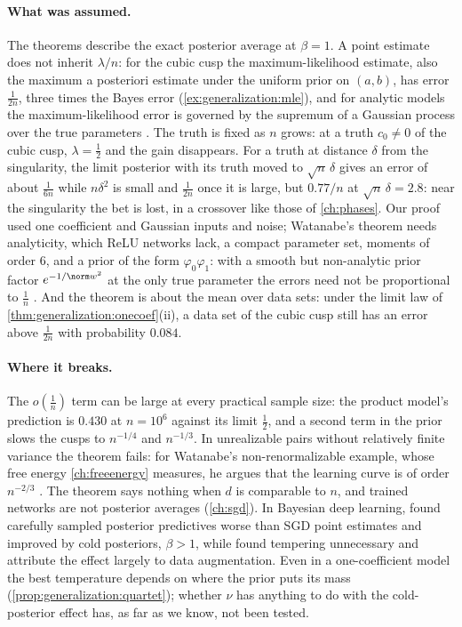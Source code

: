 \begin{refsection}
\paragraph{What was assumed.} The theorems describe the exact posterior average at $\beta=1$. A point estimate does not inherit $\lambda/n$: for the cubic cusp the maximum-likelihood estimate, also the maximum a posteriori estimate under the uniform prior on $(a,b)$, has error $\frac1{2n}$, three times the Bayes error (\cref{ex:generalization:mle}), and for analytic models the maximum-likelihood error is governed by the supremum of a Gaussian process over the true parameters \parencite{Watanabe2024}. The truth is fixed as $n$ grows: at a truth $c_0\ne0$ of the cubic cusp, $\lambda=\frac12$ and the gain disappears. For a truth at distance $\delta$ from the singularity, the limit posterior with its truth moved to $\sqrt n\,\delta$ gives an error of about $\frac1{6n}$ while $n\delta^2$ is small and $\frac1{2n}$ once it is large, but $0.77/n$ at $\sqrt n\,\delta=2.8$: near the singularity the bet is lost, in a crossover like those of \cref{ch:phases}. Our proof used one coefficient and Gaussian inputs and noise; Watanabe's theorem needs analyticity, which ReLU networks lack, a compact parameter set, moments of order $6$, and a prior of the form $\varphi_0\varphi_1$: with a smooth but non-analytic prior factor $e^{-1/\norm w^2}$ at the only true parameter the errors need not be proportional to $\frac1n$ \parencite[\S2]{Watanabe2010a}. And the theorem is about the mean over data sets: under the limit law of \cref{thm:generalization:onecoef}(ii), a data set of the cubic cusp still has an error above $\frac1{2n}$ with probability $0.084$.

\paragraph{Where it breaks.} The $o(\frac1n)$ term can be large at every practical sample size: the product model's prediction is $0.430$ at $n=10^6$ against its limit $\frac12$, and a second term in the prior slows the cusps to $n^{-1/4}$ and $n^{-1/3}$. In unrealizable pairs without relatively finite variance the theorem fails: for Watanabe's non-renormalizable example, whose free energy \cref{ch:freeenergy} measures, he argues that the learning curve is of order $n^{-2/3}$ \parencite{Watanabe2010d}. The theorem says nothing when $d$ is comparable to $n$, and trained networks are not posterior averages (\cref{ch:sgd}). In Bayesian deep learning, \textcite{WenzelEtAl2020} found carefully sampled posterior predictives worse than SGD point estimates and improved by cold posteriors, $\beta>1$, while \textcite{IzmailovEtAl2021} found tempering unnecessary and attribute the effect largely to data augmentation. Even in a one-coefficient model the best temperature depends on where the prior puts its mass (\cref{prop:generalization:quartet}); whether $\nu$ has anything to do with the cold-posterior effect has, as far as we know, not been tested.


\end{refsection}
